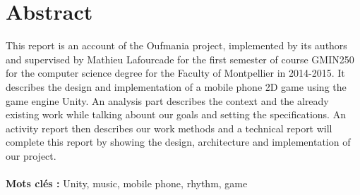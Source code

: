 \documentclass [a4 paper,11pt]{report}
\begin{document}
\section*{Abstract}
This report is an account of the Oufmania project, implemented by its authors and supervised by Mathieu Lafourcade for the first semester of course GMIN250 for the computer science degree for the Faculty of Montpellier in 2014-2015. It describes the design and implementation of a mobile phone 2D game using the game engine Unity. An analysis part describes the context and the already existing work while talking abount our goals and setting the specifications. An activity report then describes our work methods and a technical report will complete this report by showing the design, architecture and implementation of our project.
\\\\
\textbf{Mots clés : } Unity, music, mobile phone, rhythm, game
\end{document}
